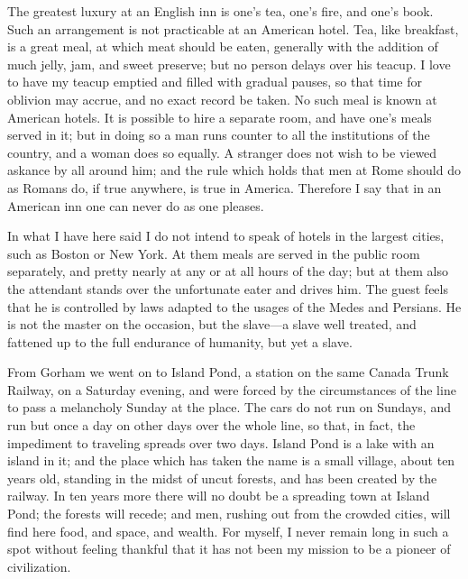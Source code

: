 The greatest luxury at an English inn is one's tea, one's fire, and
one's book.  Such an arrangement is not practicable at an American
hotel.  Tea, like breakfast, is a great meal, at which meat should
be eaten, generally with the addition of much jelly, jam, and sweet
preserve; but no person delays over his teacup.  I love to have my
teacup emptied and filled with gradual pauses, so that time for
oblivion may accrue, and no exact record be taken.  No such meal is
known at American hotels.  It is possible to hire a separate room,
and have one's meals served in it; but in doing so a man runs
counter to all the institutions of the country, and a woman does so
equally.  A stranger does not wish to be viewed askance by all
around him; and the rule which holds that men at Rome should do as
Romans do, if true anywhere, is true in America.  Therefore I say
that in an American inn one can never do as one pleases.

In what I have here said I do not intend to speak of hotels in the
largest cities, such as Boston or New York.  At them meals are
served in the public room separately, and pretty nearly at any or
at all hours of the day; but at them also the attendant stands over
the unfortunate eater and drives him.  The guest feels that he is
controlled by laws adapted to the usages of the Medes and Persians.
He is not the master on the occasion, but the slave---a slave well
treated, and fattened up to the full endurance of humanity, but yet
a slave.

From Gorham we went on to Island Pond, a station on the same Canada
Trunk Railway, on a Saturday evening, and were forced by the
circumstances of the line to pass a melancholy Sunday at the place.
The cars do not run on Sundays, and run but once a day on other
days over the whole line, so that, in fact, the impediment to
traveling spreads over two days.  Island Pond is a lake with an
island in it; and the place which has taken the name is a small
village, about ten years old, standing in the midst of uncut
forests, and has been created by the railway.  In ten years more
there will no doubt be a spreading town at Island Pond; the forests
will recede; and men, rushing out from the crowded cities, will
find here food, and space, and wealth.  For myself, I never remain
long in such a spot without feeling thankful that it has not been
my mission to be a pioneer of civilization.

